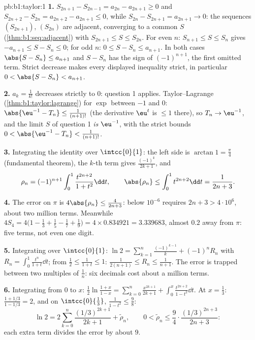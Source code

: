 \begin{solution}{pb:b1:taylor:1}
\textbf{1.} $S_{2n+1} - S_{2n-1} = a_{2n} - a_{2n+1} \geq 0$ and
$S_{2n+2} - S_{2n} = a_{2n+2} - a_{2n+1} \leq 0$, while $S_{2n}
- S_{2n+1} = a_{2n+1} \to 0$: the sequences $(S_{2n+1})$,
$(S_{2n})$ are adjacent, converging to a common $S$
(\cref{thm:b1:seq:adjacent}) with $S_{2n+1} \leq S \leq S_{2n}$.
For even $n$: $S_{n+1} \leq S \leq S_n$ gives $-a_{n+1} \leq S -
S_n \leq 0$; for odd $n$: $0 \leq S - S_n \leq a_{n+1}$. In both
cases $\abs{S - S_n} \leq a_{n+1}$ and $S - S_n$ has the sign of
$(-1)^{n+1}$, the first omitted term. Strict decrease makes
every displayed inequality strict, in particular $0 < \abs{S -
S_n} < a_{n+1}$.

\textbf{2.} $a_k = \frac{1}{k!}$ decreases strictly to $0$:
question 1 applies. Taylor--Lagrange
(\cref{thm:b1:taylor:lagrange}) for $\exp$ between $-1$ and $0$:
$\abs{\eu^{-1} - T_n} \leq \frac{1}{(n+1)!}$ (the derivative
$\eu^t$ is $\leq 1$ there), so $T_n \to \eu^{-1}$, and the limit
$S$ of question 1 \emph{is} $\eu^{-1}$, with the strict bounds
$0 < \abs{\eu^{-1} - T_n} < \frac{1}{(n+1)!}$.

\textbf{3.} Integrating the identity over $\intcc{0}{1}$: the
left side is $\arctan 1 = \frac\pi4$ (fundamental theorem), the
$k$-th term gives $\frac{(-1)^k}{2k+1}$, and
\[
\rho_n = (-1)^{n+1}\int_0^1 \frac{t^{2n+2}}{1+t^2}\dd t,
\qquad
\abs{\rho_n} \leq \int_0^1 t^{2n+2}\dd t = \frac{1}{2n+3} .
\]

\textbf{4.} The error on $\pi$ is $4\abs{\rho_n} \leq
\frac{4}{2n+3}$: below $10^{-6}$ requires $2n + 3 > 4\cdot10^6$,
about two million terms. Meanwhile $4S_4 = 4\bigl(1 - \frac13 +
\frac15 - \frac17 + \frac19\bigr) = 4 \times 0.834921 =
3.339683$, almost $0.2$ away from $\pi$: five terms, not even
one digit.

\textbf{5.} Integrating over $\intcc{0}{1}$: $\ln 2 =
\sum_{k=1}^{n} \frac{(-1)^{k-1}}{k} + (-1)^n R_n$ with $R_n =
\int_0^1 \frac{t^n}{1+t}\dd t$; from $\frac12 \leq \frac{1}{1+t}
\leq 1$: $\frac{1}{2(n+1)} \leq R_n \leq \frac{1}{n+1}$. The
error is trapped between two multiples of $\frac1n$: six
decimals cost about a million terms.

\textbf{6.} Integrating from $0$ to $x$: $\frac12\ln\frac{1 +
x}{1 - x} = \sum_{k=0}^{n} \frac{x^{2k+1}}{2k+1} + \int_0^x
\frac{t^{2n+2}}{1-t^2}\dd t$. At $x = \frac13$: $\frac{1 +
1/3}{1 - 1/3} = 2$, and on $\intcc{0}{\frac13}$, $\frac{1}{1 -
t^2} \leq \frac98$:
\[
\ln 2 = 2\sum_{k=0}^{n} \frac{(1/3)^{2k+1}}{2k+1} +
\tilde\rho_n,
\qquad
0 < \tilde\rho_n \leq \frac{9}{4}\cdot
\frac{(1/3)^{2n+3}}{2n+3} :
\]
each extra term divides the error by about $9$.


\end{solution}
